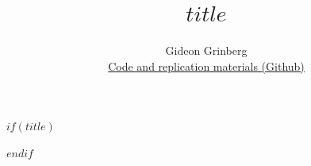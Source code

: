 
$if(title)$
\title{$title$}
$endif$

\author{
  Gideon Grinberg\\[0.5em]
  {\small
    \href{https://github.com/gideongrinberg/measuring-growth-from-space}
      {Code and replication materials (Github)}
  }
}

\date{}